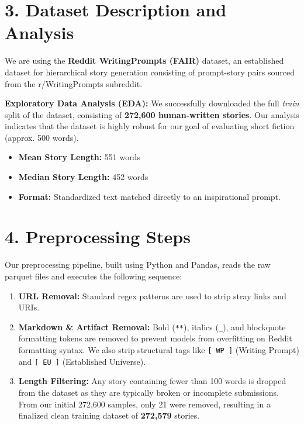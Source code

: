 \documentclass[12pt, a4paper]{article}
\begin{document}
\section*{3. Dataset Description and Analysis}
We are using the \textbf{Reddit WritingPrompts (FAIR)} dataset, an established dataset for hierarchical story generation consisting of prompt-story pairs sourced from the r/WritingPrompts subreddit.

\textbf{Exploratory Data Analysis (EDA):}
We successfully downloaded the full \textit{train} split of the dataset, consisting of \textbf{272,600 human-written stories}. Our analysis indicates that the dataset is highly robust for our goal of evaluating short fiction (approx. 500 words).
\begin{itemize}[topsep=0pt,itemsep=-1ex,partopsep=1ex,parsep=1ex]
    \item \textbf{Mean Story Length:} 551 words
    \item \textbf{Median Story Length:} 452 words
    \item \textbf{Format:} Standardized text matched directly to an inspirational prompt.
\end{itemize}

\section*{4. Preprocessing Steps}
Our preprocessing pipeline, built using Python and Pandas, reads the raw parquet files and executes the following sequence:
\begin{enumerate}[topsep=0pt,itemsep=-1ex,partopsep=1ex,parsep=1ex]
    \item \textbf{URL Removal:} Standard regex patterns are used to strip stray links and URIs.
    \item \textbf{Markdown \& Artifact Removal:} Bold (\verb|**|), italics (\verb|_|), and blockquote formatting tokens are removed to prevent models from overfitting on Reddit formatting syntax. We also strip structural tags like \verb|[ WP ]| (Writing Prompt) and \verb|[ EU ]| (Established Universe).
    \item \textbf{Length Filtering:} Any story containing fewer than 100 words is dropped from the dataset as they are typically broken or incomplete submissions. From our initial 272,600 samples, only 21 were removed, resulting in a finalized clean training dataset of \textbf{272,579} stories.
\end{enumerate}
\end{document}
